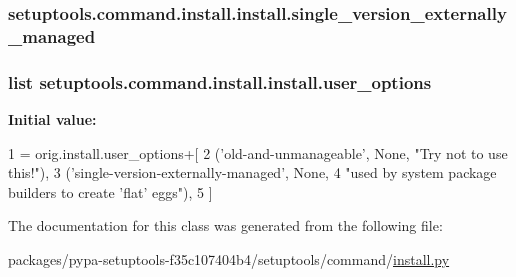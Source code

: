 \subsubsection[{single\+\_\+version\+\_\+externally\+\_\+managed}]{\setlength{\rightskip}{0pt plus 5cm}setuptools.\+command.\+install.\+install.\+single\+\_\+version\+\_\+externally\+\_\+managed}\label{classsetuptools_1_1command_1_1install_1_1install_a7a20443140985362c236e68aca2f8f55}
\hypertarget{classsetuptools_1_1command_1_1install_1_1install_a3eefebc69b82a0e966ca171b69ad6d17}{}
\subsubsection[{user\+\_\+options}]{\setlength{\rightskip}{0pt plus 5cm}list setuptools.\+command.\+install.\+install.\+user\+\_\+options\hspace{0.3cm}{\ttfamily [static]}}\label{classsetuptools_1_1command_1_1install_1_1install_a3eefebc69b82a0e966ca171b69ad6d17}
{\bfseries Initial value\+:}
\begin{DoxyCode}
1 = orig.install.user\_options+[
2         (\textcolor{stringliteral}{'old-and-unmanageable'}, \textcolor{keywordtype}{None}, \textcolor{stringliteral}{"Try not to use this!"}),
3         (\textcolor{stringliteral}{'single-version-externally-managed'}, \textcolor{keywordtype}{None},
4          \textcolor{stringliteral}{"used by system package builders to create 'flat' eggs"}),
5     ]
\end{DoxyCode}


The documentation for this class was generated from the following file\+:\begin{DoxyCompactItemize}
\item 
packages/pypa-\/setuptools-\/f35c107404b4/setuptools/command/\hyperlink{install_8py}{install.\+py}\end{DoxyCompactItemize}
